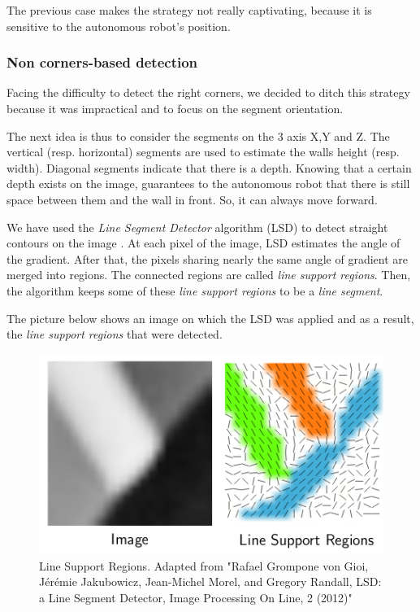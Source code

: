 \documentclass[12pt]{report}
\begin{document}
	
	 The previous case makes the strategy not really captivating, 
because it is sensitive to the autonomous robot's position.
	 
	 \subsubsection{Non corners-based detection}
	
	 Facing the difficulty to detect the right corners, 
we decided to ditch this strategy  because it was impractical and to focus on the segment orientation. 
	 
	 The next idea is thus to consider the segments on the 3 axis X,Y and Z. The vertical (resp. horizontal) 
segments are used to estimate the walls height (resp. width). Diagonal segments indicate that 
there is a depth. Knowing that a certain depth exists on the image, guarantees to the autonomous robot that there is 
still space between them and the wall in front. So, it can always move forward.
	  
	  We have used the \textit{Line Segment Detector} algorithm (LSD) to detect straight contours on the 
image \cite{grompone_von_gioi_lsd:_2012}. At each pixel of the image, LSD estimates the angle of the gradient. After 
that, the pixels sharing nearly the same angle of gradient are merged into regions. The connected regions are called 
\textit{line support regions}. Then, the algorithm keeps some of these \textit{line support regions} to be a 
\textit{line segment}.
	  
	 
	  The picture below shows an image on which the LSD was applied and as a result, the \textit{line support regions} that were detected.
	  	\begin{figure}[H]
	  	\begin{center}
	  		\includegraphics[scale=0.6]{res/lsr.png}
	  		\caption{Line Support Regions. Adapted from "Rafael Grompone von Gioi, Jérémie Jakubowicz, Jean-Michel Morel, and Gregory Randall, LSD: a Line Segment Detector, Image Processing On Line, 2 (2012)" }
	  	\end{center}
	  \end{figure}
  
\end{document}
